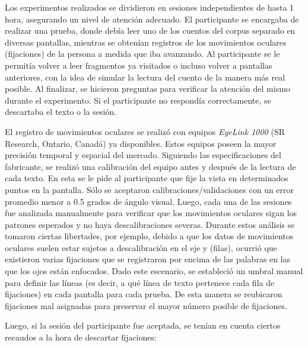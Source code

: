 Los experimentos realizados se dividieron en sesiones independientes de hasta 1 hora, asegurando un nivel de atención adecuado. El participante se encargaba de realizar una prueba, donde debía leer uno de los cuentos del corpus separado en diversas pantallas, mientras se obtenían registros de los movimientos oculares (fijaciones) de la persona a medida que iba avanzando. Al participante se le permitía volver a leer fragmentos ya visitados o incluso volver a pantallas anteriores, con la idea de simular la lectura del cuento de la manera más real posible. Al finalizar, se hicieron preguntas para verificar la atención del mismo durante el experimento. Si el participante no respondía correctamente, se descartaba el texto o la sesión.

El registro de movimientos oculares se realizó con equipos \textit{EyeLink 1000} (SR Research, Ontario, Canadá) ya disponibles. Estos equipos poseen la mayor precisión temporal y espacial del mercado. Siguiendo las especificaciones del fabricante, se realizó una calibración del equipo antes y después de la lectura de cada texto. En esta se le pide al participante que fije la vista en determinados puntos en la pantalla. Sólo se aceptaron calibraciones/validaciones con un error promedio menor a 0.5 grados de ángulo visual. Luego, cada una de las sesiones fue analizada manualmente para verificar que los movimientos oculares sigan los patrones esperados y no haya descalibraciones severas. Durante estos análisis se tomaron ciertas libertades, por ejemplo, debido a que los datos de movimientos oculares suelen estar sujetos a descalibración en el eje y (filas), ocurrió que existieron varias fijaciones que se registraron por encima de las palabras en las que los ojos están enfocados. Dado este escenario, se estableció un umbral manual para definir las líneas (es decir, a qué línea de texto pertenece cada fila de fijaciones) en cada pantalla para cada prueba. De esta manera se reubicaron fijaciones mal asignadas para preservar el mayor número posible de fijaciones.

Luego, si la sesión del participante fue aceptada, se tenían en cuenta ciertos recaudos a la hora de descartar fijaciones:

